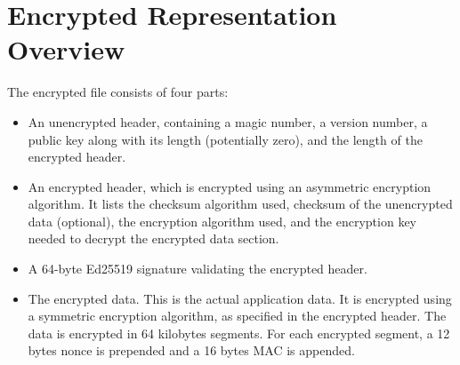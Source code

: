\section{Encrypted Representation Overview}
The encrypted file consists of four parts:

\begin{itemize}
\item An unencrypted header, containing a magic number, a version
  number, a public key along with its length (potentially zero), and
  the length of the encrypted header.
\item An encrypted header, which is encrypted using an asymmetric
  encryption algorithm. 
  It lists the checksum algorithm used, checksum of the unencrypted
  data (optional), the encryption algorithm used, and the encryption
  key needed to decrypt the encrypted data section.
\item A 64-byte Ed25519 signature validating the encrypted header.
\item The encrypted data.
  This is the actual application data.
  It is encrypted using a symmetric encryption algorithm, as specified
  in the encrypted header.
  The data is encrypted in 64 kilobytes segments. For each encrypted
  segment, a 12 bytes nonce is prepended and a 16 bytes MAC is appended.
\end{itemize}
